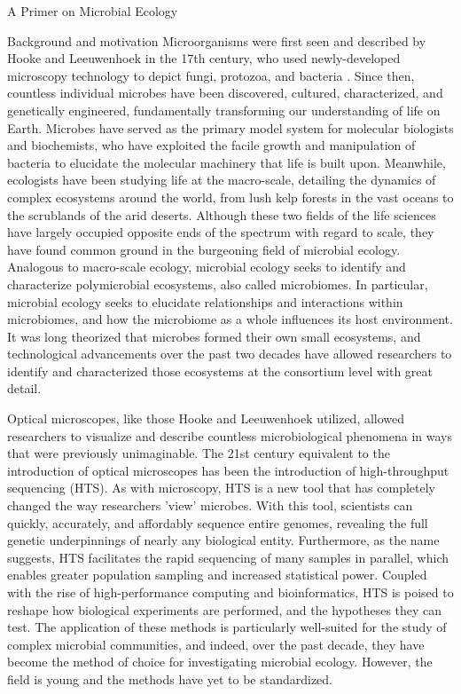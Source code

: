 \documentclass[oneside,12pt,final]{sty/ucthesis-CA2012}
\begin{document}
\begin{mainmatter}
\begin{section}{A Primer on Microbial Ecology}
\begin{subsection}{Background and motivation}
Microorganisms were first seen and described by Hooke and Leeuwenhoek in the 17th century, who used newly-developed microscopy technology to depict fungi, protozoa, and bacteria \cite{RN106}. Since then, countless individual microbes have been discovered, cultured, characterized, and genetically engineered, fundamentally transforming our understanding of life on Earth. Microbes have served as the primary model system for molecular biologists and biochemists, who have exploited the facile growth and manipulation of bacteria to elucidate the molecular machinery that life is built upon. Meanwhile, ecologists have been studying life at the macro-scale, detailing the dynamics of complex ecosystems around the world, from lush kelp forests in the vast oceans to the scrublands of the arid deserts. Although these two fields of the life sciences have largely occupied opposite ends of the spectrum with regard to scale, they have found common ground in the burgeoning field of microbial ecology. Analogous to macro-scale ecology, microbial ecology seeks to identify and characterize polymicrobial ecosystems, also called microbiomes. In particular, microbial ecology seeks to elucidate relationships and interactions within microbiomes, and how the microbiome as a whole influences its host environment. It was long theorized that microbes formed their own small ecosystems, and technological advancements over the past two decades have allowed researchers to identify and characterized those ecosystems at the consortium level with great detail. 

Optical microscopes, like those Hooke and Leeuwenhoek utilized, allowed researchers to visualize and describe countless microbiological phenomena in ways that were previously unimaginable. The 21st century equivalent to the introduction of optical microscopes has been the introduction of high-throughput sequencing (HTS). As with microscopy, HTS is a new tool that has completely changed the way researchers 'view' microbes. With this tool, scientists can quickly, accurately, and affordably sequence entire genomes, revealing the full genetic underpinnings of nearly any biological entity. Furthermore, as the name suggests, HTS facilitates the rapid sequencing of many samples in parallel, which enables greater population sampling and increased statistical power. Coupled with the rise of high-performance computing and bioinformatics, HTS is poised to reshape how biological experiments are performed, and the hypotheses they can test. The application of these methods is particularly well-suited for the study of complex microbial communities, and indeed, over the past decade, they have become the method of choice for investigating microbial ecology. However, the field is young and the methods have yet to be standardized.
\end{subsection}


\end{section}
\end{mainmatter}
\end{document}
